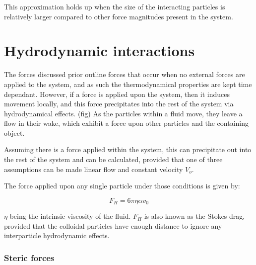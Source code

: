 This approximation holds up when the size of the interacting particles is relatively larger compared to other force magnitudes present in the system. 

\cite{DLVOsmolOverview, smolBook1}


\cite{DLVOsmolOverview, smolBook1, Origin2V, IsGreenBook}

\cite{surfpattQ} \cite{Surfquestion} 

%





\section{Hydrodynamic interactions}
The forces discussed prior outline forces that occur when no external forces are applied to the system, and as such the thermodynamical properties are kept time dependant. However, if a force is applied upon the system, then it induces movement locally, and this force precipitates into the rest of the system via hydrodynamical effects. (fig) As the particles within a fluid move, they leave a flow in their wake, which exhibit a force upon other particles and the containing object.

Assuming there is a force applied within the system, this can precipitate out into the rest of the system and can be calculated, provided that one of three assumptions can be made linear flow and constant velocity \(V_o\). 

The force applied upon any single particle under those conditions is given by:

\begin{equation}
F_H = 6 \pi \eta \alpha v_0
\end{equation}

$\eta$ being the intrinsic viscosity of the fluid. $F_H$ is also known as the Stokes drag, provided that the colloidal particles have enough distance to ignore any interparticle hydrodynamic effects.\cite{?}

\subsubsection{Steric forces}

